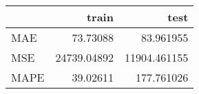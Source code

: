 \begin{tabular}{lrr}
\toprule
{} &        train &          test \\
\midrule
MAE  &     73.73088 &     83.961955 \\
MSE  &  24739.04892 &  11904.461155 \\
MAPE &     39.02611 &    177.761026 \\
\bottomrule
\end{tabular}
